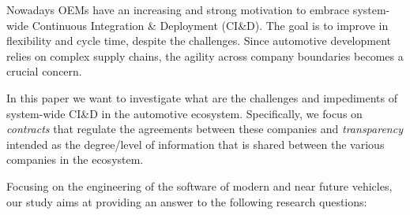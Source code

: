 Nowadays OEMs have an increasing and strong motivation
to embrace system-wide Continuous Integration \& Deployment (CI\&D). The goal is to improve
in flexibility and cycle time, despite the challenges. 
Since automotive development relies on complex supply chains, the agility across company boundaries becomes a crucial concern.

In this paper we want to investigate %
what are the challenges and impediments of system-wide CI\&D in the automotive ecosystem. 
Specifically, we focus on {\em contracts} that regulate the agreements between these companies 
and {\em transparency} intended as the degree/level of information that is shared between the various companies in the ecosystem. 

Focusing on the engineering of the software of modern and near future vehicles, our study aims at providing an answer to the following research questions:

%

